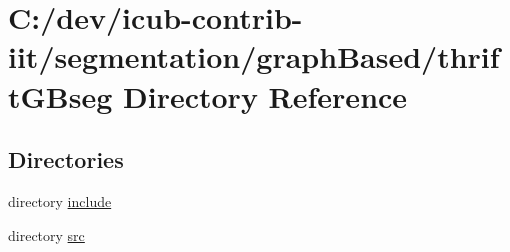 \section{C\+:/dev/icub-\/contrib-\/iit/segmentation/graph\+Based/thrift\+G\+Bseg Directory Reference}
\label{dir_bbf36cd9c3e396ab0a5619e1e6da30b4}
\subsection*{Directories}
\begin{DoxyCompactItemize}
\item 
directory \hyperlink{dir_57c85e712734feea42b0ca8ed7ef603b}{include}
\item 
directory \hyperlink{dir_17577debad2190b7f7e6dd9464b475fe}{src}
\end{DoxyCompactItemize}
